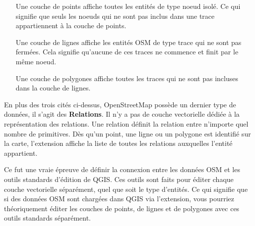 \begin{itemize}[label=--]
\item[Une couche de points ] affiche toutes les entités de type noeud isolé. Ce qui signifie que seuls les noeuds qui ne sont pas inclus dans une trace appartiennent à la couche de points.
\item [Une couche de lignes] affiche les entités OSM de type trace qui ne sont pas fermées. Cela signifie qu'aucune de ces traces ne commence et finit par le même noeud.
\item[Une couche de polygones] affiche toutes les traces qui ne sont pas incluses dans la couche de lignes.
\end{itemize}

En plus des trois cités ci-dessus, OpenStreetMap possède un dernier type de données, il s'agit des \textbf{Relations}. Il n'y a pas de couche vectorielle dédiée à la représentation des relations. Une relation définit la relation entre n'importe quel nombre de primitives. Dès qu'un point, une ligne ou un polygone est identifié sur la carte, l'extension affiche la liste de toutes les relations auxquelles l'entité appartient.

Ce fut une vraie épreuve de définir la connexion entre les données OSM et les outils standards d'édition de QGIS. Ces outils sont faits pour éditer chaque couche vectorielle séparément, quel que soit le type d'entités. Ce qui signifie que si des données OSM sont chargées dans QGIS via l'extension, vous pourriez théoriquement éditer les couches de points, de lignes et de polygones avec ces outils standards séparément.

